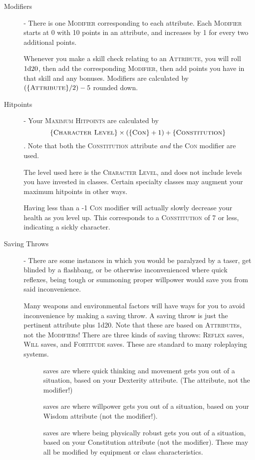 \begin{description}
	\item[Modifiers] - There is one \textsc{Modifier} corresponding to each attribute. Each \textsc{Modifier} starts at 0 with 10 points in an attribute, and increases by 1 for every two additional points.
	
	Whenever you make a skill check relating to an \textsc{Attribute}, you will roll $1\mathrm{d}20$, then add the corresponding \textsc{Modifier}, then add points you have in that skill and any bonuses. Modifiers are calculated by $(\{ \textsc{Attribute} \}/2) - 5 $ rounded down.
	
	\item[Hitpoints] - Your \textsc{Maximum Hitpoints} are calculated by $$\{ \textsc{Character Level} \} \times (\{ \textsc{Con} \}+1) + \{ \textsc{Constitution} \}$$. Note that both the \textsc{Constitution} attribute \emph{and} the \textsc{Con} modifier are used.
	
	The level used here is the \textsc{Character Level}, and does not include levels you have invested in classes. Certain specialty classes may augment your maximum hitpoints in other ways.
	
	Having less than a -1 \textsc{Con} modifier will actually slowly decrease your health as you level up. This corresponds to a \textsc{Constitution} of 7 or less, indicating a sickly character.

	\item[Saving Throws] - There are some instances in which you would be paralyzed by a taser, get blinded by a flashbang, or be otherwise inconvenienced where quick reflexes, being tough or summoning proper willpower would save you from said inconvenience.
	
	Many weapons and environmental factors will have ways for you to avoid inconvenience by making a saving throw. A saving throw is just the pertinent attribute plus 1d20. Note that these are based on \textsc{Attribute}s, not the \textsc{Modifier}s! There are three kinds of saving throws: \textsc{Reflex} saves, \textsc{Will} saves, and \textsc{Fortitude} saves. These are standard to many roleplaying systems.
	\begin{description}
		\item[] saves are where quick thinking and movement gets you out of a situation, based on your Dexterity attribute. (The attribute, not the modifier!)
		\item[] saves are where willpower gets you out of a situation, based on your Wisdom attribute (not the modifier!). 
		\item[] saves are where being physically robust gets you out of a situation, based on your Constitution attribute (not the modifier).
		These may all be modified by equipment or class characteristics.
	\end{description}
	

\end{description}
